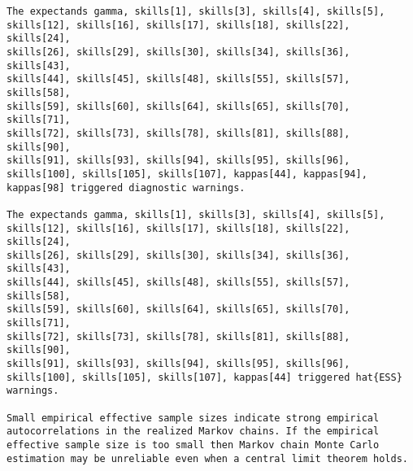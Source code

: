 \documentclass[
  letterpaper,
  DIV=11,
  numbers=noendperiod]{scrartcl}
\newenvironment{Shaded}{\begin{snugshade}}{\end{snugshade}}
\newcommand{\AttributeTok}[1]{\textcolor[rgb]{0.40,0.45,0.13}{#1}}
\newcommand{\DecValTok}[1]{\textcolor[rgb]{0.68,0.00,0.00}{#1}}
\newcommand{\FunctionTok}[1]{\textcolor[rgb]{0.28,0.35,0.67}{#1}}
\newcommand{\NormalTok}[1]{\textcolor[rgb]{0.00,0.23,0.31}{#1}}
\newcommand{\OtherTok}[1]{\textcolor[rgb]{0.00,0.23,0.31}{#1}}
\newcommand{\SpecialCharTok}[1]{\textcolor[rgb]{0.37,0.37,0.37}{#1}}
\newcommand{\StringTok}[1]{\textcolor[rgb]{0.13,0.47,0.30}{#1}}
\begin{document}
\begin{verbatim}
The expectands gamma, skills[1], skills[3], skills[4], skills[5],
skills[12], skills[16], skills[17], skills[18], skills[22], skills[24],
skills[26], skills[29], skills[30], skills[34], skills[36], skills[43],
skills[44], skills[45], skills[48], skills[55], skills[57], skills[58],
skills[59], skills[60], skills[64], skills[65], skills[70], skills[71],
skills[72], skills[73], skills[78], skills[81], skills[88], skills[90],
skills[91], skills[93], skills[94], skills[95], skills[96],
skills[100], skills[105], skills[107], kappas[44], kappas[94],
kappas[98] triggered diagnostic warnings.

The expectands gamma, skills[1], skills[3], skills[4], skills[5],
skills[12], skills[16], skills[17], skills[18], skills[22], skills[24],
skills[26], skills[29], skills[30], skills[34], skills[36], skills[43],
skills[44], skills[45], skills[48], skills[55], skills[57], skills[58],
skills[59], skills[60], skills[64], skills[65], skills[70], skills[71],
skills[72], skills[73], skills[78], skills[81], skills[88], skills[90],
skills[91], skills[93], skills[94], skills[95], skills[96],
skills[100], skills[105], skills[107], kappas[44] triggered hat{ESS}
warnings.

Small empirical effective sample sizes indicate strong empirical
autocorrelations in the realized Markov chains. If the empirical
effective sample size is too small then Markov chain Monte Carlo
estimation may be unreliable even when a central limit theorem holds.
\end{verbatim}

\begin{Shaded}
\end{Shaded}
\end{document}
